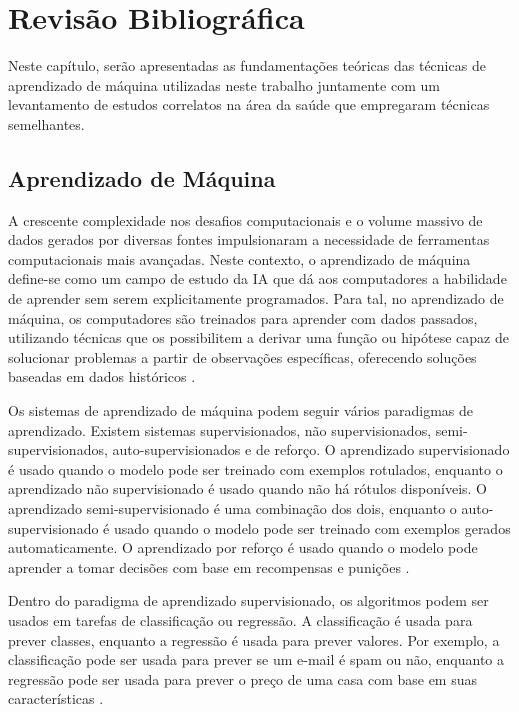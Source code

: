 
\chapter[Revisão Bibliográfica]{Revisão Bibliográfica}
\label{Revisão}
Neste capítulo, serão apresentadas as fundamentações teóricas das técnicas de aprendizado de máquina utilizadas neste trabalho juntamente com um levantamento de estudos correlatos na área da saúde que empregaram técnicas semelhantes.

\section{Aprendizado de Máquina}
A crescente complexidade nos desafios computacionais e o volume massivo de dados gerados por diversas fontes impulsionaram a necessidade de ferramentas computacionais mais avançadas. Neste contexto, o aprendizado de máquina define-se como um campo de estudo da IA que dá aos computadores a habilidade de aprender sem serem explicitamente programados. Para tal, no aprendizado de máquina, os computadores são treinados para aprender com dados passados, utilizando técnicas que os possibilitem a derivar uma função ou hipótese capaz de solucionar problemas a partir de observações específicas, oferecendo soluções baseadas em dados históricos \cite{faceli}.

Os sistemas de aprendizado de máquina podem seguir vários paradigmas de aprendizado. Existem sistemas supervisionados, não supervisionados, semi-supervisionados, auto-supervisionados e de reforço. O aprendizado supervisionado é usado quando o modelo pode ser treinado com exemplos rotulados, enquanto o aprendizado não supervisionado é usado quando não há rótulos disponíveis. O aprendizado semi-supervisionado é uma combinação dos dois, enquanto o auto-supervisionado é usado quando o modelo pode ser treinado com exemplos gerados automaticamente. O aprendizado por reforço é usado quando o modelo pode aprender a tomar decisões com base em recompensas e punições \cite{geron2022hands}.

Dentro do paradigma de aprendizado supervisionado, os algoritmos podem ser usados em tarefas de classificação ou regressão. A classificação é usada para prever classes, enquanto a regressão é usada para prever valores. Por exemplo, a classificação pode ser usada para prever se um e-mail é spam ou não, enquanto a regressão pode ser usada para prever o preço de uma casa com base em suas características \cite{geron2022hands}.

